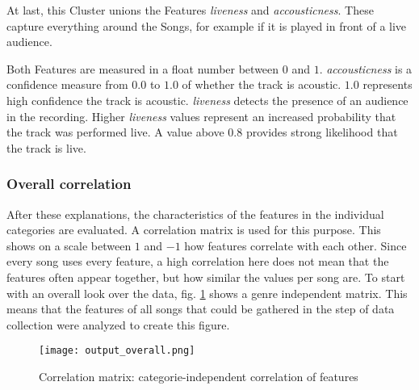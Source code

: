At last, this Cluster unions the Features \emph{liveness} and \emph{accousticness}.
These capture everything around the Songs, for example if it is played in front of a live audience.

Both Features are measured in a float number between \(0\) and \(1\).
\emph{accousticness} is a confidence measure from \(0.0\) to \(1.0\) of whether the track is acoustic. \(1.0\) represents high confidence the track is acoustic. 
\emph{liveness} detects the presence of an audience in the recording. 
Higher \emph{liveness} values represent an increased probability that the track was performed live.
A value above \(0.8\) provides strong likelihood that the track is live. 

\subsubsection{Overall correlation}
After these explanations, the characteristics of the features in the individual categories are evaluated.
A correlation matrix is used for this purpose. This shows on a scale between \(1\) and \(-1\) how
features correlate with each other. Since every song uses every feature,
a high correlation here does not mean that the features often appear together,
but how similar the values per song are. To start with an overall look over the data,
fig. \ref{fig:du_cm_overall}  shows a genre independent matrix.
This means that the features of all songs that could be gathered in the step of data
collection were analyzed to create this figure. \cite[]{Features}

\begin{figure}[H]
    \centering
    \caption[]{Correlation matrix: categorie-independent correlation of features}
	\label{fig:du_cm_overall}
    \texttt{[image: output\_overall.png]}
\end{figure}

